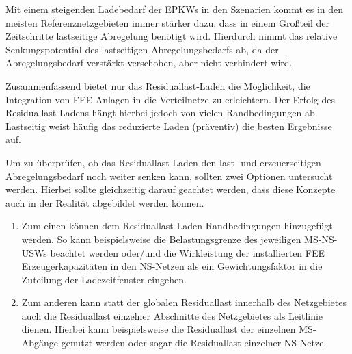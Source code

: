 Mit einem steigenden Ladebedarf der \glspl{EPKW} in den Szenarien kommt es in den meisten Referenznetzgebieten immer stärker dazu, dass in einem Großteil der Zeitschritte lastseitige Abregelung benötigt wird.
Hierdurch nimmt das relative Senkungspotential des lastseitigen Abregelungsbedarfs ab, da der Abregelungsbedarf verstärkt verschoben, aber nicht verhindert wird.\medskip

Zusammenfassend bietet nur das Residuallast-Laden die Möglichkeit, die Integration von \gls{FEE} Anlagen in die Verteilnetze zu erleichtern.
Der Erfolg des Residuallast-Ladens hängt hierbei jedoch von vielen Randbedingungen ab.
Lastseitig weist häufig das reduzierte Laden (präventiv) die besten Ergebnisse auf.\medskip

Um zu überprüfen, ob das Residuallast-Laden den last- und erzeuerseitigen Abregelungsbedarf noch weiter senken kann, sollten zwei Optionen untersucht werden.
Hierbei sollte gleichzeitig darauf geachtet werden, dass diese Konzepte auch in der Realität abgebildet werden können.

\begin{enumerate}
	\item Zum einen können dem Residuallast-Laden Randbedingungen hinzugefügt werden.
	So kann beispielsweise die Belastungsgrenze des jeweiligen \gls{MS}-\gls{NS}-\glspl{USW} beachtet werden oder/und die Wirkleistung der installierten \gls{FEE} Erzeugerkapazitäten in den \gls{NS}-Netzen als ein Gewichtungsfaktor in die Zuteilung der Ladezeitfenster eingehen.
	\item Zum anderen kann statt der globalen Residuallast innerhalb des Netzgebietes auch die Residuallast einzelner Abschnitte des Netzgebietes als Leitlinie dienen.
	Hierbei kann beispielsweise die Residuallast der einzelnen \gls{MS}-Abgänge genutzt werden oder sogar die Residuallast einzelner \gls{NS}-Netze.
\end{enumerate}


